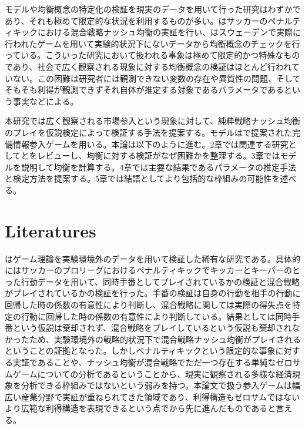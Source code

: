 \documentclass{jsarticle}
\begin{document}
モデルや均衡概念の特定化の検証を現実のデータを用いて行った研究はわずかであり、それも極めて限定的な状況を利用するものが多い。\cite{Chiappori2002}はサッカーのペナルティキックにおける混合戦略ナッシュ均衡の実証を行い、\cite{Ostling2011}はスウェーデンで実際に行われたゲームを用いて実験的状況下にないデータから均衡概念のチェックを行っている。こういった研究において扱われる事象は極めて限定的かつ特殊なものであり、社会で広く観察される現象に対する均衡概念の検証はほとんど行われていない。この困難は研究者には観測できない変数の存在や異質性の問題、そしてそもそも利得が観測できずそれ自体が推定する対象であるパラメータであるという事実などによる。

本研究では広く観察される市場参入という現象に対して、純粋戦略ナッシュ均衡のプレイを仮説検定によって検証する手法を提案する。モデルは\cite{Bresnahan1991}で提案された完備情報参入ゲームを用いる。本論は以下のように進む。2章では関連する研究として\cite{Ostling2011}と\cite{Chiappori2002}をレビューし、均衡に対する検証がなぜ困難かを整理する。3章ではモデルを説明して均衡を計算する。4章では主要な結果であるパラメータの推定手法と検定方法を提案する。5章では結語としてより包括的な枠組みの可能性を述べる。


\section{Literatures}

\cite{Chiappori2002}はゲーム理論を実験環境外のデータを用いて検証した稀有な研究である。具体的にはサッカーのプロリーグにおけるペナルティキックでキッカーとキーパーのとった行動データを用いて、同時手番としてプレイされているかの検証と混合戦略がプレイされているかの検証を行った。手番の検証は自身の行動を相手の行動に回帰した時の係数の有意性により判断し、混合戦略に関しては実際の得失点を特定の行動に回帰した時の係数の有意性により判断している。結果としては同時手番という仮説は棄却されず、混合戦略をプレイしているという仮説も棄却されなかったため、実験環境外の戦略的状況下で混合戦略ナッシュ均衡がプレイされるということの証拠となった。しかしペナルティキックという限定的な事象に対する実証であることや、ナッシュ均衡が混合戦略でただ一つ存在する単純なゼロサムゲームについての分析であるということから、現実に観察される多様な経済現象を分析できる枠組みではないという弱みを持つ。本論文で扱う参入ゲームは幅広い産業分野で実証が重ねられてきた領域であり、利得構造もゼロサムではないより広範な利得構造を表現できるという点で\cite{Chiappori2002}から先に進んだものであると言える。
\end{document}
